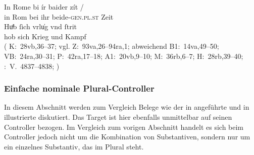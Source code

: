 \begin{exe}
\ex \label{ex:k_beider}

		\gll In Rome bi ír baider zít {/} \\
			in Rom bei ihr beide-\textsc{gen.pl.st} Zeit \\
		\gll Huͦb ſich vrlu̍g vnd ſtrit \\
			hob sich Krieg und Kampf \\
		\trans {}
			(%
				K:~28vb,36--37; vgl.
				Z:~93va,26--94ra,1; abweichend
				B1:~14va,49--50;
				VB:~24ra,30--31;
				P:~42ra,17--18;
				A1:~20vb,9--10;
				M:~36rb,6--7;
				H:~28rb,39--40;
				\KC:~V.~4837--4838;
				\cite[170]{schroeder1895}%
			)

\end{exe}

\subsubsection{Einfache nominale Plural-Controller}
\label{subsubsec:nomctrlpers}

In diesem Abschnitt werden zum Vergleich Belege wie der in
 angeführte und in  illustrierte
diskutiert. Das Target   ist hier ebenfalls unmittelbar
auf seinen Controller bezogen. Im Vergleich zum vorigen Abschnitt handelt es
sich beim Controller jedoch nicht um die Kombination von Substantiven, sondern
nur um ein einzelnes Substantiv, das im Plural steht.

